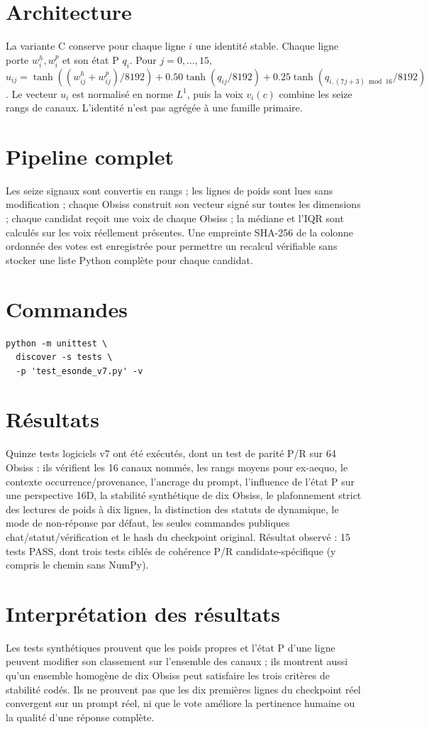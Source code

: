 \documentclass[11pt,a4paper]{report}
\begin{document}
\section{Architecture}
La variante C conserve pour chaque ligne $i$ une identité stable. Chaque ligne porte $w_i^h,w_i^p$ et son état P $q_i$. Pour $j=0,\ldots,15$, $u_{ij}=\tanh((w^h_{ij}+w^p_{ij})/8192)+0.50\tanh(q_{ij}/8192)+0.25\tanh(q_{i,(7j+3)\bmod16}/8192)$. Le vecteur $u_i$ est normalisé en norme $L^1$, puis la voix $v_i(c)$ combine les seize rangs de canaux. L'identité n'est pas agrégée à une famille primaire.
\section{Pipeline complet}
Les seize signaux sont convertis en rangs ; les lignes de poids sont lues sans modification ; chaque Obsiss construit son vecteur signé sur toutes les dimensions ; chaque candidat reçoit une voix de chaque Obsiss ; la médiane et l'IQR sont calculés sur les voix réellement présentes. Une empreinte SHA-256 de la colonne ordonnée des votes est enregistrée pour permettre un recalcul vérifiable sans stocker une liste Python complète pour chaque candidat.
\section{Commandes}
\begin{verbatim}
python -m unittest \
  discover -s tests \
  -p 'test_esonde_v7.py' -v
\end{verbatim}
\section{Résultats}
Quinze tests logiciels v7 ont été exécutés, dont un test de parité P/R sur 64 Obsiss : ils vérifient les 16 canaux nommés, les rangs moyens pour ex-aequo, le contexte occurrence/provenance, l'ancrage du prompt, l'influence de l'état P sur une perspective 16D, la stabilité synthétique de dix Obsiss, le plafonnement strict des lectures de poids à dix lignes, la distinction des statuts de dynamique, le mode de non-réponse par défaut, les seules commandes publiques chat/statut/vérification et le hash du checkpoint original. Résultat observé : 15 tests PASS, dont trois tests ciblés de cohérence P/R candidate-spécifique (y compris le chemin sans NumPy).
\section{Interprétation des résultats}
Les tests synthétiques prouvent que les poids propres et l'état P d'une ligne peuvent modifier son classement sur l'ensemble des canaux ; ils montrent aussi qu'un ensemble homogène de dix Obsiss peut satisfaire les trois critères de stabilité codés. Ils ne prouvent pas que les dix premières lignes du checkpoint réel convergent sur un prompt réel, ni que le vote améliore la pertinence humaine ou la qualité d'une réponse complète.
\end{document}
